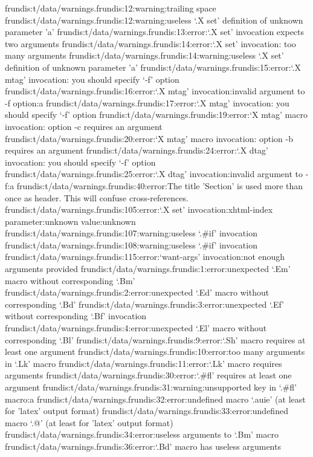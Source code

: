 frundis:t/data/warnings.frundis:12:warning:trailing space
frundis:t/data/warnings.frundis:12:warning:useless `.X set' definition of unknown parameter 'a'
frundis:t/data/warnings.frundis:13:error:`.X set' invocation expects two arguments
frundis:t/data/warnings.frundis:14:error:`.X set' invocation: too many arguments
frundis:t/data/warnings.frundis:14:warning:useless `.X set' definition of unknown parameter 'a'
frundis:t/data/warnings.frundis:15:error:`.X mtag' invocation: you should specify `-f' option
frundis:t/data/warnings.frundis:16:error:`.X mtag' invocation:invalid argument to -f option:a
frundis:t/data/warnings.frundis:17:error:`.X mtag' invocation: you should specify `-f' option
frundis:t/data/warnings.frundis:19:error:`X mtag' macro invocation: option -c requires an argument
frundis:t/data/warnings.frundis:20:error:`X mtag' macro invocation: option -b requires an argument
frundis:t/data/warnings.frundis:24:error:`.X dtag' invocation: you should specify `-f' option
frundis:t/data/warnings.frundis:25:error:`.X dtag' invocation:invalid argument to -f:a
frundis:t/data/warnings.frundis:40:error:The title 'Section' is used more than once as header.  This will confuse cross-references.
frundis:t/data/warnings.frundis:105:error:`.X set' invocation:xhtml-index parameter:unknown value:unknown
frundis:t/data/warnings.frundis:107:warning:useless `.#if' invocation
frundis:t/data/warnings.frundis:108:warning:useless `.#if' invocation
frundis:t/data/warnings.frundis:115:error:`want-args' invocation:not enough arguments provided
frundis:t/data/warnings.frundis:1:error:unexpected `.Em' macro without corresponding `.Bm'
frundis:t/data/warnings.frundis:2:error:unexpected `.Ed' macro without corresponding `.Bd'
frundis:t/data/warnings.frundis:3:error:unexpected `.Ef' without corresponding `.Bf' invocation
frundis:t/data/warnings.frundis:4:error:unexpected `.El' macro without corresponding `.Bl'
frundis:t/data/warnings.frundis:9:error:`.Sh' macro requires at least one argument
frundis:t/data/warnings.frundis:10:error:too many arguments in `.Lk' macro
frundis:t/data/warnings.frundis:11:error:`.Lk' macro requires arguments
frundis:t/data/warnings.frundis:30:error:`.#fl' requires at least one argument
frundis:t/data/warnings.frundis:31:warning:unsupported key in `.#fl' macro:a
frundis:t/data/warnings.frundis:32:error:undefined macro `.auie' (at least for 'latex' output format)
frundis:t/data/warnings.frundis:33:error:undefined macro `.@' (at least for 'latex' output format)
frundis:t/data/warnings.frundis:34:error:useless arguments to `.Bm' macro
frundis:t/data/warnings.frundis:36:error:`.Bd' macro has useless arguments
